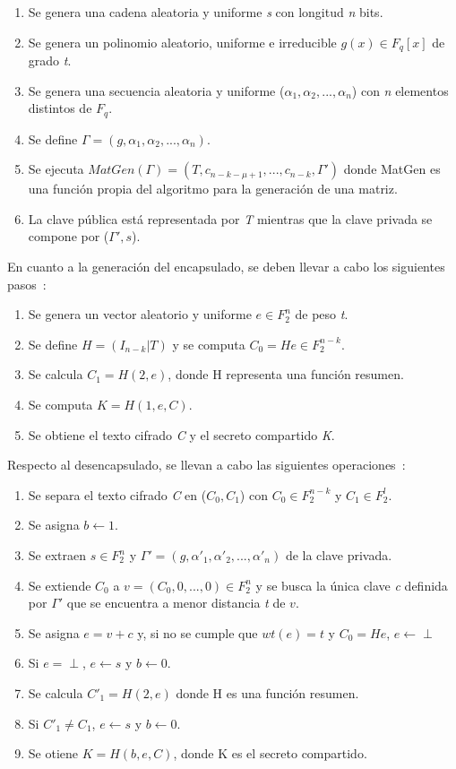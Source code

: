 \begin{enumerate}
    \item Se genera una cadena aleatoria y uniforme \textit{s} con longitud \textit{n} bits.
    \item Se genera un polinomio aleatorio, uniforme e irreducible $g(x)\in F_q[x]$ de grado \textit{t}.
    \item Se genera una secuencia aleatoria y uniforme ($\alpha_1, \alpha_2,...,\alpha_n$) con \textit{n} elementos distintos de $F_q$.
    \item Se define $\Gamma =(g,\alpha_1, \alpha_2,...,\alpha_n)$.
    \item Se ejecuta $MatGen(\Gamma)=(T,c_{n-k-\mu+1},...,c_{n-k},\Gamma')$ donde MatGen es una función propia del algoritmo para la generación de una matriz.
    \item La clave pública está representada por \textit{T} mientras que la clave privada se compone por ($\Gamma',s$).
\end{enumerate}

En cuanto a la generación del encapsulado, se deben llevar a cabo los siguientes pasos~\cite{mceliece_spec}:

\begin{enumerate}
    \item Se genera un vector aleatorio y uniforme $e\in F_2^n$ de peso \textit{t}.
    \item Se define $H=(I_{n-k}|T)$ y se computa $C_0=He\in F_2^{n-k}$.
    \item Se calcula $C_1=H(2,e)$, donde H representa una función resumen.
    \item Se computa $K=H(1,e,C)$.
    \item Se obtiene el texto cifrado \textit{C} y el secreto compartido \textit{K}.
\end{enumerate}

Respecto al desencapsulado, se llevan a cabo las siguientes operaciones~\cite{mceliece_spec}:

\begin{enumerate}
    \item Se separa el texto cifrado \textit{C} en ($C_0,C_1$) con $C_0\in F_2^{n-k}$ y $C_1\in F_2^l$.
    \item Se asigna $b\leftarrow 1$.
    \item Se extraen $s\in F_2^n$ y $\Gamma'=(g,\alpha'_1, \alpha'_2,...,\alpha'_n)$ de la clave privada.
    \item Se extiende $C_0$ a $v=(C_0,0,...,0)\in F_2^n$ y se busca la única clave \textit{c} definida por $\Gamma'$ que se encuentra a menor distancia \textit{t} de $v$.
    \item Se asigna $e=v+c$ y, si no se cumple que $wt(e)=\textit{t}$ y $C_0=He$, $e\leftarrow \perp$
    \item Si $e=\perp$, $e\leftarrow s$ y $b\leftarrow 0$.
    \item Se calcula $C'_1=H(2,e)$ donde H es una función resumen.
    \item Si $C'_1\neq C_1$, $e\leftarrow s$ y $b\leftarrow 0$.
    \item Se otiene $K=H(b,e,C)$, donde K es el secreto compartido.
\end{enumerate}

